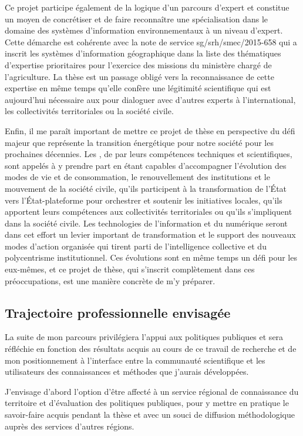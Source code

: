 Ce projet participe également de la logique d'un
parcours d'expert et constitue un moyen de concrétiser et de
faire reconnaître une spécialisation dans le domaine
des systèmes d'information environnementaux
à un niveau d'expert. Cette démarche est cohérente avec
la note de service {\sc sg/srh/smec/2015-658} qui a inscrit les systèmes
d'information géographique dans la liste des thématiques d'expertise prioritaires
pour l'exercice des missions du ministère chargé de l'agriculture.
La thèse est un passage obligé vers la reconnaissance de cette expertise
en même temps qu'elle confère une légitimité scientifique
qui est aujourd'hui nécessaire aux {\IPEF} pour dialoguer
avec d'autres experts à l'international,
les collectivités territoriales ou la société civile.

Enfin, il me paraît important de mettre ce projet de thèse en perspective
du défi majeur que représente la transition énergétique 
pour notre société pour les prochaines décennies.
Les {\IPEF}, de par leurs compétences techniques
et scientifiques, sont appelés à y prendre part en étant capables d'accompagner
l'évolution des modes de vie et de consommation,
le renouvellement des institutions et le mouvement de la société civile,
qu'ils participent à la transformation de l'État vers l'État-plateforme
pour orchestrer et soutenir les initiatives locales,
qu'ils apportent leurs compétences aux collectivités territoriales
ou qu'ils s'impliquent dans la société civile.
Les technologies de l'information et du numérique seront dans cet effort
un levier important de transformation
et le support des nouveaux modes d'action organisée
qui tirent parti de l'intelligence collective
et du polycentrisme institutionnel.
Ces évolutions sont en même temps un défi pour les {\IPEF} eux-mêmes,
et ce projet de thèse, qui s'inscrit complètement
dans ces préoccupations, est une manière concrète de m'y préparer.


\subsection
{Trajectoire professionnelle envisagée}

La suite de mon parcours privilégiera l'appui aux politiques publiques
et sera réfléchie en fonction des résultats
acquis au cours de ce travail de recherche et de mon positionnement
à l'interface entre la communauté scientifique et les utilisateurs
des connaissances et méthodes que j'aurais développées.

J'envisage d'abord l'option d'être affecté à un service régional
de connaissance du territoire et d'évaluation des politiques publiques,
pour y mettre en pratique le savoir-faire acquis pendant la thèse
et avec un souci de diffusion méthodologique auprès des services d'autres régions.

